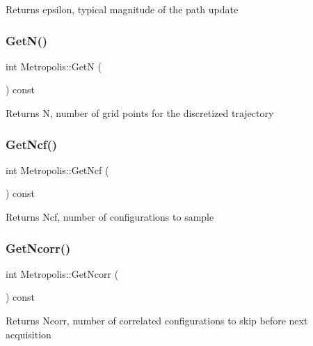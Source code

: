 \begin{DoxyReturn}{Returns}
epsilon, typical magnitude of the path update 
\end{DoxyReturn}
\mbox{\label{classMetropolis_acaa8e2e9e8e13f0333f2fc0dd17ab135}} 
\subsubsection{\texorpdfstring{Get\+N()}{GetN()}}
{\footnotesize\ttfamily int Metropolis\+::\+GetN (\begin{DoxyParamCaption}{ }\end{DoxyParamCaption}) const}

\begin{DoxyReturn}{Returns}
N, number of grid points for the discretized trajectory 
\end{DoxyReturn}
\mbox{\label{classMetropolis_a1ac082e2dbbadb602fb30cb15d945a14}} 
\subsubsection{\texorpdfstring{Get\+Ncf()}{GetNcf()}}
{\footnotesize\ttfamily int Metropolis\+::\+Get\+Ncf (\begin{DoxyParamCaption}{ }\end{DoxyParamCaption}) const}

\begin{DoxyReturn}{Returns}
Ncf, number of configurations to sample 
\end{DoxyReturn}
\mbox{\label{classMetropolis_abd453b3613ebecb226c0e8ad07ac26cf}} 
\subsubsection{\texorpdfstring{Get\+Ncorr()}{GetNcorr()}}
{\footnotesize\ttfamily int Metropolis\+::\+Get\+Ncorr (\begin{DoxyParamCaption}{ }\end{DoxyParamCaption}) const}

\begin{DoxyReturn}{Returns}
Ncorr, number of correlated configurations to skip before next acquisition 
\end{DoxyReturn}
\mbox{\label{classMetropolis_abfc33a0d7604c24e0337e8a16fa60971}} 

